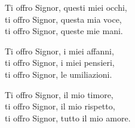 

\spazio

\strofa Ti offro Signor, questi miei occhi,\\
ti offro Signor, questa mia voce,\\
ti offro Signor, queste mie mani.

\spazio


\spazio

\strofa Ti offro Signor, i miei affanni,\\
ti offro Signor, i miei pensieri,\\
ti offro Signor, le umiliazioni.

\spazio


\spazio

\strofa Ti offro Signor, il mio timore,\\
ti offro Signor, il mio rispetto,\\
ti offro Signor, tutto il mio amore.

\spazio

